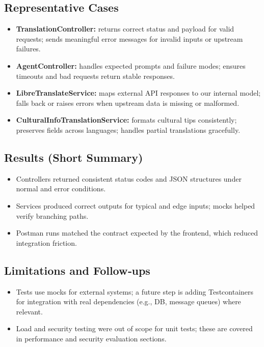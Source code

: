 \subsection{Representative Cases}
\begin{itemize}
    \item \textbf{TranslationController:} returns correct status and payload for valid requests; sends meaningful error messages for invalid inputs or upstream failures.
    \item \textbf{AgentController:} handles expected prompts and failure modes; ensures timeouts and bad requests return stable responses.
    \item \textbf{LibreTranslateService:} maps external API responses to our internal model; falls back or raises errors when upstream data is missing or malformed.
    \item \textbf{CulturalInfoTranslationService:} formats cultural tips consistently; preserves fields across languages; handles partial translations gracefully.
\end{itemize}

\subsection{Results (Short Summary)}
\begin{itemize}
    \item Controllers returned consistent status codes and JSON structures under normal and error conditions.
    \item Services produced correct outputs for typical and edge inputs; mocks helped verify branching paths.
    \item Postman runs matched the contract expected by the frontend, which reduced integration friction.
\end{itemize}

\subsection{Limitations and Follow‑ups}
\begin{itemize}
    \item Tests use mocks for external systems; a future step is adding Testcontainers for integration with real dependencies (e.g., DB, message queues) where relevant.
    \item Load and security testing were out of scope for unit tests; these are covered in performance and security evaluation sections.
\end{itemize}

